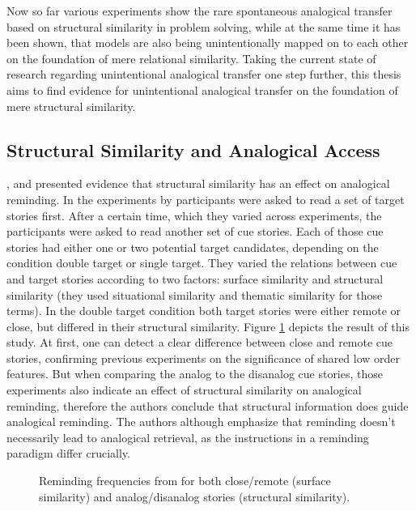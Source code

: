 \documentclass[a4paper,man,natbib,floatsintext,import]{apa6}
\begin{document}

Now so far various experiments show the rare spontaneous analogical transfer based on structural similarity in problem solving, while at the same time it has been shown, that models are also being unintentionally mapped on to each other on the foundation of mere relational similarity. Taking the current state of research regarding unintentional analogical transfer one step further, this thesis aims to find evidence for unintentional analogical transfer on the foundation of mere structural similarity.

\subsection{Structural Similarity and Analogical Access}
\cite{Holyoak1987}, \cite{Johnson1992} and \cite{Wharton1996} presented evidence that structural similarity has an effect on analogical reminding. In the experiments by \cite{Wharton1996} participants were asked to read a set of target stories first. After a certain time, which they varied across experiments, the participants were asked to read another set of cue stories. Each of those cue stories had either one or two potential target candidates, depending on the condition double target or single target. They varied the relations between cue and target stories according to two factors: surface similarity and structural similarity (they used situational similarity and thematic similarity for those terms). In the double target condition both target stories were either remote or close, but differed in their structural similarity. Figure \ref{fig:wharton} depicts the result of this study. At first, one can detect a clear difference between close and remote cue stories, confirming previous experiments on the significance of shared low order features. But when comparing the analog to the disanalog cue stories, those experiments also indicate an effect of structural similarity on analogical reminding, therefore the authors conclude that structural information does guide analogical reminding. The authors although emphasize that reminding doesn't necessarily lead to analogical retrieval, as the instructions in a reminding paradigm differ crucially.

\begin{figure}
\centering
\begin{minipage}[t]{0.5\textwidth}
\caption{Reminding frequencies from \cite{Wharton1996} for both close/remote (surface similarity) and analog/disanalog stories (structural similarity).}
\label{fig:wharton}
\end{minipage}
\end{figure}
\end{document}
